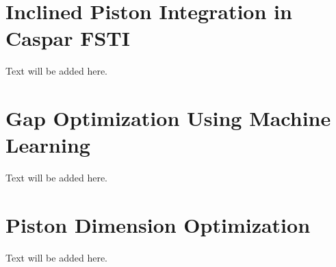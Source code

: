 

\section{Inclined Piston Integration in Caspar FSTI}
Text will be added here.

\section{Gap Optimization Using Machine Learning}
Text will be added here.

\section{Piston Dimension Optimization}
Text will be added here.
